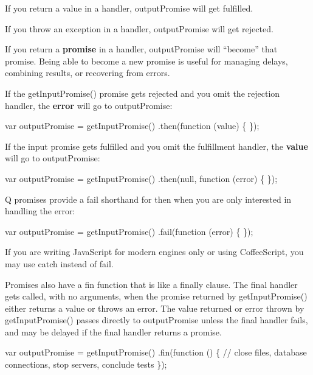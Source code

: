 \begin{DoxyItemize}
\item If you return a value in a handler, {\ttfamily output\+Promise} will get fulfilled.
\item If you throw an exception in a handler, {\ttfamily output\+Promise} will get rejected.
\item If you return a {\bfseries promise} in a handler, {\ttfamily output\+Promise} will “become” that promise. Being able to become a new promise is useful for managing delays, combining results, or recovering from errors.
\end{DoxyItemize}

If the {\ttfamily get\+Input\+Promise()} promise gets rejected and you omit the rejection handler, the {\bfseries error} will go to {\ttfamily output\+Promise}\+:


\begin{DoxyCode}
var outputPromise = getInputPromise()
.then(function (value) \{
\});
\end{DoxyCode}


If the input promise gets fulfilled and you omit the fulfillment handler, the {\bfseries value} will go to {\ttfamily output\+Promise}\+:


\begin{DoxyCode}
var outputPromise = getInputPromise()
.then(null, function (error) \{
\});
\end{DoxyCode}


Q promises provide a {\ttfamily fail} shorthand for {\ttfamily then} when you are only interested in handling the error\+:


\begin{DoxyCode}
var outputPromise = getInputPromise()
.fail(function (error) \{
\});
\end{DoxyCode}


If you are writing Java\+Script for modern engines only or using Coffee\+Script, you may use {\ttfamily catch} instead of {\ttfamily fail}.

Promises also have a {\ttfamily fin} function that is like a {\ttfamily finally} clause. The final handler gets called, with no arguments, when the promise returned by {\ttfamily get\+Input\+Promise()} either returns a value or throws an error. The value returned or error thrown by {\ttfamily get\+Input\+Promise()} passes directly to {\ttfamily output\+Promise} unless the final handler fails, and may be delayed if the final handler returns a promise.


\begin{DoxyCode}
var outputPromise = getInputPromise()
.fin(function () \{
    // close files, database connections, stop servers, conclude tests
\});
\end{DoxyCode}



